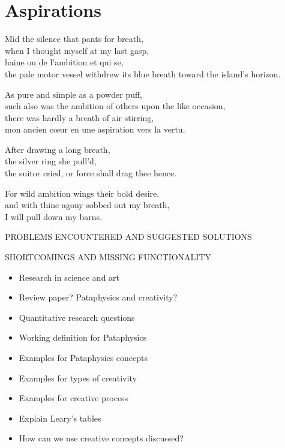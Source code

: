 
\chapter{Aspirations}
\label{ch:future}

\startcontents[chapters]

Mid the silence that pants for breath, \\
when I thought myself at my last gasp, \\
haine ou de l'ambition et qui se, \\
the pale motor vessel withdrew its blue breath toward the island's horizon.

As pure and simple as a powder puff, \\
such also was the ambition of others upon the like occasion, \\
there was hardly a breath of air stirring, \\
mon ancien cœur en une aspiration vers la vertu.

After drawing a long breath, \\
the silver ring she pull'd, \\
the suitor cried, or force shall drag thee hence.

For wild ambition wings their bold desire, \\
and with thine agony sobbed out my breath, \\
I will pull down my barns.

\minicontents

PROBLEMS ENCOUNTERED AND SUGGESTED SOLUTIONS

SHORTCOMINGS AND MISSING FUNCTIONALITY

\begin{itemize}
  \item Research in science and art
  \item Review paper? Pataphysics and creativity?
  \item Quantitative research questions
  \item Working definition for Pataphysics
  \item Examples for Pataphysics concepts
  \item Examples for types of creativity
  \item Examples for creative process
  \item Explain Leary's tables
  \item How can we use creative concepts discussed?
\end{itemize}



